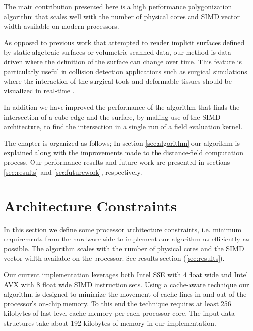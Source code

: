 The main contribution presented here is a high performance polygonization algorithm that scales well with the 
number of physical cores and SIMD vector width available on modern processors.

As opposed to previous work that attempted to render implicit surfaces defined by static algebraic surfaces or 
volumetric scanned data, our method is data-driven where the definition of the surface can change over time. This feature 
is particularly useful in collision detection applications such as surgical simulations where the interaction
of the surgical tools and deformable tissues should be visualized in real-time \cite{Laycock2007}. 
 
In addition we have improved the performance of the algorithm that finds the intersection of a cube edge and the surface, by making use of the SIMD architecture, 
to find the intersection in a single run of a field evaluation kernel.


The chapter is organized as follows;  In section \ref{sec:algorithm} our algorithm is explained along with 
the improvements made to the distance-field computation process. Our performance results and future 
work are presented in sections \ref{sec:results} and \ref{sec:futurework}, respectively.

\section{Architecture Constraints}\label{sec:architecture}
In this section we define some processor architecture constraints, i.e. minimum 
requirements from the hardware side to implement our algorithm as efficiently as possible.
The algorithm scales with the number of physical cores and the SIMD vector width available on the processor.  
See results section (\ref{sec:results}). 

Our current implementation leverages both Intel SSE with 4 float wide and Intel AVX with 8 float wide SIMD instruction sets.
Using a cache-aware technique our algorithm is designed to minimize the movement of cache lines in and out of the processor's on-chip 
memory. To this end the technique requires at least 256 kilobytes of last level cache memory per each processor core. 
The input data structures take about 192 kilobytes of memory in our implementation.

